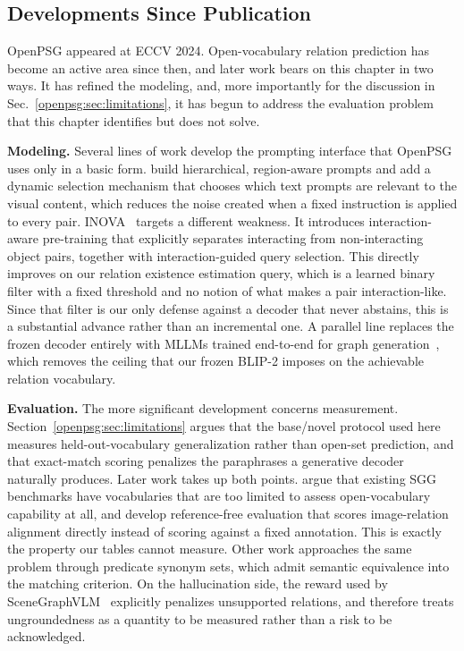 \subsection{Developments Since Publication}
\label{openpsg:sec:post_publication}
OpenPSG appeared at ECCV 2024. Open-vocabulary relation prediction has become an active area since then, and later work bears on this chapter in two ways. It has refined the modeling, and, more importantly for the discussion in Sec.~\ref{openpsg:sec:limitations}, it has begun to address the evaluation problem that this chapter identifies but does not solve.

\noindent \textbf{Modeling.}
Several lines of work develop the prompting interface that OpenPSG uses only in a basic form. \citet{liu2025relation} build hierarchical, region-aware prompts and add a dynamic selection mechanism that chooses which text prompts are relevant to the visual content, which reduces the noise created when a fixed instruction is applied to every pair. INOVA~\citep{li2025inova} targets a different weakness. It introduces interaction-aware pre-training that explicitly separates interacting from non-interacting object pairs, together with interaction-guided query selection. This directly improves on our relation existence estimation query, which is a learned binary filter with a fixed threshold and no notion of what makes a pair interaction-like. Since that filter is our only defense against a decoder that never abstains, this is a substantial advance rather than an incremental one. A parallel line replaces the frozen decoder entirely with MLLMs trained end-to-end for graph generation~\citep{feng2026sggr3, makarov2026scenegraphvlm}, which removes the ceiling that our frozen BLIP-2 imposes on the achievable relation vocabulary.

\noindent \textbf{Evaluation.}
The more significant development concerns measurement. Section~\ref{openpsg:sec:limitations} argues that the base/novel protocol used here measures held-out-vocabulary generalization rather than open-set prediction, and that exact-match scoring penalizes the paraphrases a generative decoder naturally produces. Later work takes up both points. \citet{neau2025measuring} argue that existing SGG benchmarks have vocabularies that are too limited to assess open-vocabulary capability at all, and develop reference-free evaluation that scores image-relation alignment directly instead of scoring against a fixed annotation. This is exactly the property our tables cannot measure. Other work approaches the same problem through predicate synonym sets, which admit semantic equivalence into the matching criterion. On the hallucination side, the reward used by SceneGraphVLM~\citep{makarov2026scenegraphvlm} explicitly penalizes unsupported relations, and therefore treats ungroundedness as a quantity to be measured rather than a risk to be acknowledged.

